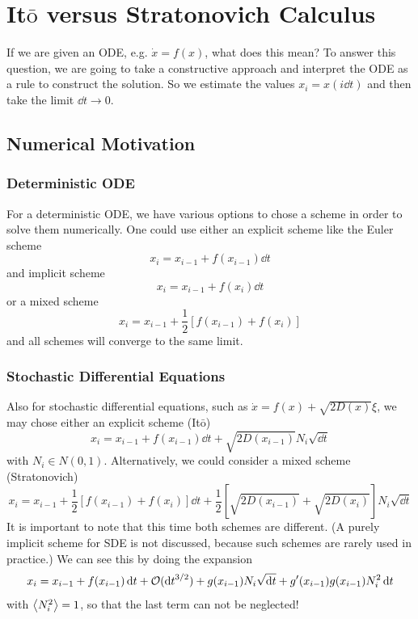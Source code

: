 \documentclass{/home/ben/Templates/notebook}
\begin{document}
	\chapter{It$\bar{\mathrm{o}}$ versus Stratonovich Calculus}
	
	If we are given an ODE, e.g. $\dot{x} = f(x)$, what does this mean? To answer this question, we are going to take a constructive approach and interpret the ODE as a rule to construct the solution. So we estimate the values $x_i = x(i \dd{t})$ and then take the limit $\dd{t} \to 0$.
	
	\section{Numerical Motivation}
	
	\subsection*{Deterministic ODE} 
	
	For a deterministic ODE, we have various options to chose a scheme in order to solve them numerically. One could use either an explicit scheme like the Euler scheme 
	\begin{equation}
	x_i = x_{i-1} + f(x_{i-1}) \dd{t}
	\end{equation}
	and implicit scheme 
	\begin{equation}
	x_i = x_{i-1} + f(x_i) \dd{t}
	\end{equation}
	or a mixed scheme
	\begin{equation}
	x_i = x_{i-1} + \frac{1}{2} [f(x_{i-1}) + f(x_i)]
	\end{equation}
	and all schemes will converge to the same limit.
	
	\subsection*{Stochastic Differential Equations} 
	
	Also for stochastic differential equations, such as $\dot{x} = f(x) + \sqrt{2 D(x)} \xi$, we may chose either an explicit scheme (It$\bar{\mathrm{o}}$) 
	\begin{equation}
	x_i = x_{i-1} + f(x_{i-1}) \dd{t} + \sqrt{2 D(x_{i-1})} N_i \sqrt{\dd{t}}
	\end{equation}
	with $N_i \in N(0,1)$. Alternatively, we could consider a mixed scheme (Stratonovich)
	\begin{equation}
	x_i = x_{i-1} + \frac{1}{2} [f(x_{i-1}) + f(x_i)] \dd{t} + \frac{1}{2} [\sqrt{2 D(x_{i-1})} + \sqrt{2 D(x_i)}] N_i \sqrt{\dd{t}}
	\end{equation}
	It is important to note that this time both schemes are different. (A purely implicit scheme for SDE is not discussed, because such schemes are rarely used in practice.) We can see this by doing the expansion
	\begin{equation}
	x_i = x_{i-1} + f(x_{i-1}) \dd{t} + \mathcal{O}(\dd{t}^{3/2}) + g(x_{i-1}) N_i \sqrt{\dd{t}} + g'(x_{i-1}) g(x_{i-1}) N_i^2 \dd{t}
	\end{equation}
	with $\expval{N_i^2} = 1$, so that the last term can not be neglected!
	
\end{document}
